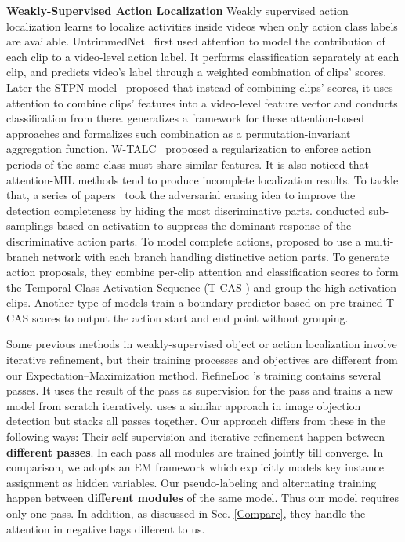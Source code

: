 \documentclass[runningheads]{llncs}
\begin{document}
\textbf{Weakly-Supervised Action Localization}
Weakly supervised action localization learns to localize activities inside videos when only action class labels are available. UntrimmedNet~\cite{wang2017untrimmednets} first used attention to model the contribution of each clip to a video-level action label. It performs classification separately at each clip, and predicts video's label through a weighted combination of clips' scores. Later the STPN model~\cite{nguyen2018weakly} proposed that instead of combining clips' scores, it uses attention to combine clips' features into a video-level feature vector and conducts classification from there. \cite{ilse2018attention} generalizes a framework for these attention-based approaches and formalizes such combination as a permutation-invariant aggregation function. W-TALC~\cite{paul2018w} proposed a regularization to enforce action periods of the same class must share similar features. It is also noticed that attention-MIL methods tend to produce incomplete localization results. To tackle that, a series of papers~\cite{singh2017hide,su2018cascaded,zeng2019breaking,zhong2018step} took the adversarial erasing idea to improve the detection completeness by hiding the most discriminative parts. \cite{yuan2019marginalized} conducted sub-samplings based on activation to suppress the dominant response of the discriminative action parts. To model complete actions, \cite{liu2019completeness} proposed to use a multi-branch network with each branch handling distinctive action parts. To generate action proposals, they combine per-clip attention and classification scores to form the Temporal Class Activation Sequence (T-CAS \cite{nguyen2018weakly}) and group the high activation clips. Another type of models \cite{shou2018autoloc,liu2019weakly} train a boundary predictor based on pre-trained T-CAS scores to output the action start and end point without grouping. 

\smallskip
Some previous methods in weakly-supervised object or action localization involve iterative refinement, but their  training processes and objectives are different from our Expectation–Maximization method. RefineLoc \cite{alwassel2019refineloc}'s training contains several passes. It uses the result of the  pass as supervision for the  pass and trains a new model from scratch iteratively. \cite{tang2017multiple} uses a similar approach in image objection detection but stacks all passes together. Our approach differs from these in the following ways: Their self-supervision and iterative refinement happen between \textbf{different passes}. In each pass all modules are trained jointly till converge. In comparison, we adopts an EM framework which explicitly models key instance assignment as hidden variables. Our pseudo-labeling and alternating training happen between \textbf{different modules} of the same model. Thus our model requires only one pass. In addition, as discussed in Sec. \ref{Compare}, they handle the attention in negative bags different to us.
\end{document}
